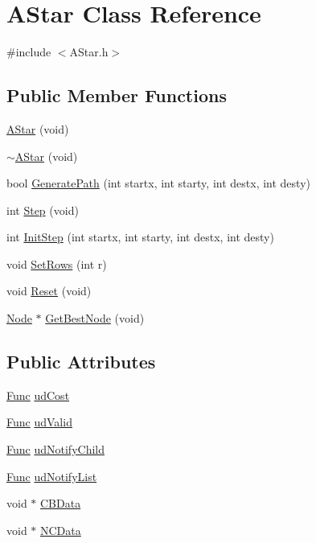 \hypertarget{class_a_star}{
\section{AStar Class Reference}
\label{class_a_star}
}


{\ttfamily \#include $<$AStar.h$>$}

\subsection*{Public Member Functions}
\begin{DoxyCompactItemize}
\item 
\hyperlink{class_a_star_ac24e9dfcf9b10e277a2b84d864786cd8}{AStar} (void)
\item 
\hyperlink{class_a_star_a6a19cecaac38d0cc8f7f812f027ea98e}{$\sim$AStar} (void)
\item 
bool \hyperlink{class_a_star_a49456dd3428034ad96ab7e2bcdae6397}{GeneratePath} (int startx, int starty, int destx, int desty)
\item 
int \hyperlink{class_a_star_ab7acb36f1266e9149b674a8b59c2671d}{Step} (void)
\item 
int \hyperlink{class_a_star_ae0a4ccaa8582189a62afdb04f73c43b7}{InitStep} (int startx, int starty, int destx, int desty)
\item 
void \hyperlink{class_a_star_af91228c86f696a0f66eaf6b6dd7368f2}{SetRows} (int r)
\item 
void \hyperlink{class_a_star_ade8f2b86e351895bab6336c4725da0a3}{Reset} (void)
\item 
\hyperlink{class_node}{Node} $\ast$ \hyperlink{class_a_star_aa0713000dd611a2855cc4eb96afcc5ce}{GetBestNode} (void)
\end{DoxyCompactItemize}
\subsection*{Public Attributes}
\begin{DoxyCompactItemize}
\item 
\hyperlink{_node_8h_a65d456bd1d6bcbf35022277e41f5c9c7}{Func} \hyperlink{class_a_star_a6daaa58fc52045c6a4fad6b7a1fec60a}{udCost}
\item 
\hyperlink{_node_8h_a65d456bd1d6bcbf35022277e41f5c9c7}{Func} \hyperlink{class_a_star_a2c97615a0ad52039bec2a7ceaab772a2}{udValid}
\item 
\hyperlink{_node_8h_a65d456bd1d6bcbf35022277e41f5c9c7}{Func} \hyperlink{class_a_star_ab5a6376f40d9746e71447acb3b8a05bd}{udNotifyChild}
\item 
\hyperlink{_node_8h_a65d456bd1d6bcbf35022277e41f5c9c7}{Func} \hyperlink{class_a_star_a1a4896338d482138954cfbfbd9e93641}{udNotifyList}
\item 
void $\ast$ \hyperlink{class_a_star_a5a3067f9cf62dd1542f91f90c2b5dc0a}{CBData}
\item 
void $\ast$ \hyperlink{class_a_star_a4fe11c564dceb3cac1352c7fadc0efef}{NCData}
\end{DoxyCompactItemize}


